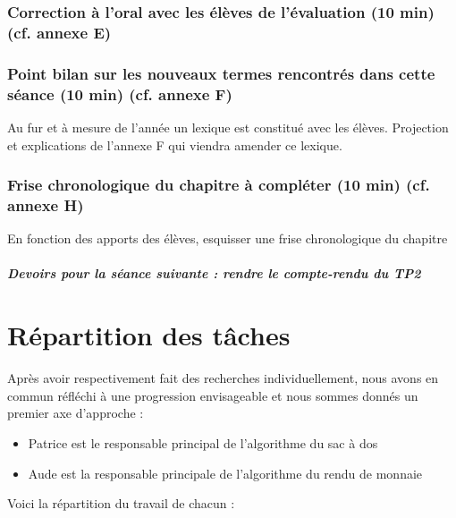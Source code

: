 \documentclass[12pt,french]{report}
\begin{document}
\subsection{Correction à l'oral avec les élèves de l'évaluation (10 min) (cf. annexe E)}
\subsection{Point bilan sur les nouveaux termes rencontrés dans cette séance (10 min) (cf. annexe F)}
Au fur et à mesure de l’année un lexique est constitué avec les élèves.
Projection et explications de l’annexe F qui viendra amender ce lexique.
\subsection{Frise chronologique du chapitre à compléter  (10 min) (cf. annexe H)}
En fonction des apports des élèves, esquisser une frise chronologique du chapitre\\
\paragraph{Devoirs pour la séance suivante : rendre le compte-rendu du TP2\\
}
\chapter{Répartition des tâches}
Après avoir respectivement fait des recherches individuellement,
nous avons en commun réfléchi à une progression envisageable et nous sommes donnés un premier axe d'approche :
\begin {itemize}
\item Patrice est le responsable principal de l'algorithme du sac à dos
\item Aude est la responsable principale de l'algorithme du rendu de monnaie
\end{itemize}
Voici la répartition du travail de chacun :\\
\end{document}
